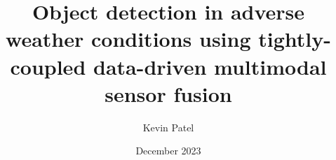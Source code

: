 \documentclass[rnd]{mas_report}
\author{Kevin Patel}
\title{Object detection in adverse weather conditions using tightly-coupled data-driven multimodal sensor fusion}
\date{December 2023}
\begin{document}
\frontmatter

\begin{titlepage}
    \maketitle
\end{titlepage}

\cleardoublepage
{}

\pagestyle{plain}
\cleardoublepage
\statementpage




\tableofcontents


\mainmatter %

\pagestyle{mainmatter}





% 



\begin{appendices}
    
\end{appendices}

\backmatter


\end{document}
